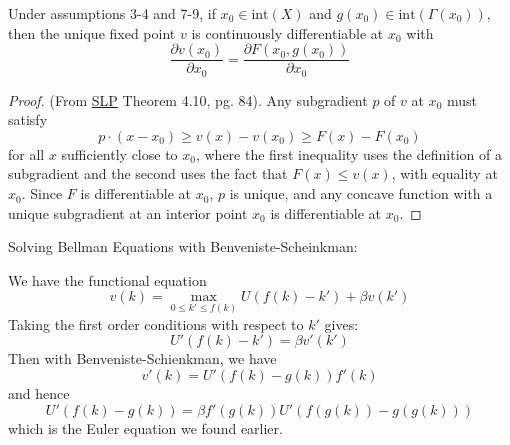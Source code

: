\documentclass[10pt]{article}
\begin{document}
\begin{theorem}\label{thm:benveniste_schienkman}
	 Under assumptions 3-4 and 7-9, if $x_0 \in \text{int}(X)$ and $g(x_0) \in \text{int}(\Gamma(x_0))$, then the unique fixed point $v$ is continuously differentiable at $x_0$ with
	\[
	\frac{\partial v(x_0)}{\partial x_0} = \frac{\partial F(x_0,g(x_0))}{\partial x_0}
	\]
\end{theorem}
\begin{proof}
	(From \href{https://www.hup.harvard.edu/books/9780674750968}{SLP} Theorem 4.10, pg. 84). Any subgradient $p$ of $v$ at $x_0$ must satisfy
	\[
	p \cdot (x - x_0) \ge v(x) - v(x_0) \ge F(x) - F(x_0)
	\]
	for all $x$ sufficiently close to $x_0$, where the first inequality uses the definition of a subgradient and the second uses the fact that $F(x) \le v(x)$, with equality at $x_0$. Since $F$ is differentiable at $x_0$, $p$ is unique, and any concave function with a unique subgradient at an interior point $x_0$ is differentiable at $x_0$.
\end{proof}

\begin{example}
	Solving Bellman Equations with Benveniste-Scheinkman:
	
	We have the functional equation
	\[
	v(k) = \max_{0 \le k' \le f(k)} U(f(k) - k') + \beta v(k')
	\]
	Taking the first order conditions with respect to $k'$ gives:
	\[
	U'(f(k) - k') = \beta v'(k')
	\]
	Then with Benveniste-Schienkman, we have
	\[
	v'(k) = U'(f(k) - g(k)) f'(k)
	\]
	and hence
	\[
	U'(f(k) - g(k)) = \beta f'(g(k)) U'(f(g(k)) - g(g(k)))
	\]
	which is the Euler equation we found earlier.
\end{example}
\end{document}
